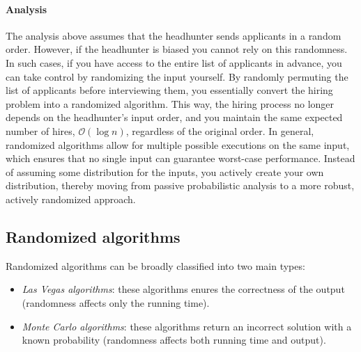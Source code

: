 \paragraph*{Analysis}
The analysis above assumes that the headhunter sends applicants in a random order. 
However, if the headhunter is biased you cannot rely on this randomness. 
In such cases, if you have access to the entire list of applicants in advance, you can take control by randomizing the input yourself.
By randomly permuting the list of applicants before interviewing them, you essentially convert the hiring problem into a randomized algorithm. 
This way, the hiring process no longer depends on the headhunter's input order, and you maintain the same expected number of hires, $\mathcal{O}(\log n)$, regardless of the original order.
In general, randomized algorithms allow for multiple possible executions on the same input, which ensures that no single input can guarantee worst-case performance. 
Instead of assuming some distribution for the inputs, you actively create your own distribution, thereby moving from passive probabilistic analysis to a more robust, actively randomized approach. 

\subsection{Randomized algorithms}
Randomized algorithms can be broadly classified into two main types: 
\begin{itemize}
    \item \textit{Las Vegas algorithms}: these algorithms enures the correctness of the output (randomness affects only the running time). 
    \item \textit{Monte Carlo algorithms}: these algorithms return an incorrect solution with a known probability (randomness affects both running time and output). 
\end{itemize}
